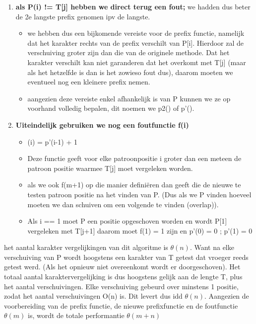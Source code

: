 \begin{enumerate}
\item \textbf{als P(i) != T[j] hebben we direct terug een fout;} we hadden dus beter de 2e langste prefix genomen ipv de langste.
\begin{itemize}
\item we hebben dus een bijkomende vereiste voor de prefix functie, namelijk dat het karakter rechts van de prefix verschilt van P[i]. Hierdoor zal de verschuiving groter zijn dan die van de originele methode. Dat het karakter verschilt kan niet garanderen dat het overkomt met T[j] (maar als het hetzelfde is dan is het zowieso fout dus), daarom moeten we eventueel nog een kleinere prefix nemen.
\item aangezien deze vereiste enkel afhankelijk is van P kunnen we ze op voorhand volledig bepalen, dit noemen we p2() of p'().
\end{itemize}
\clearpage
\item \textbf{Uiteindelijk gebruiken we nog een foutfunctie f(i)}
\begin{itemize}
\item (i) = p'(i-1) + 1
\item Deze functie geeft voor elke patroonpositie i groter dan een meteen de patroon positie waarmee T[j] moet vergeleken worden.
\item als we ook f(m+1) op die manier defini\"eren dan geeft die de nieuwe te testen patroon positie na het vinden van P. (Dus als we P vinden hoeveel moeten we dan schuiven om een volgende te vinden (overlap)).
\item Als i == 1 moet P een positie opgeschoven worden en wordt P[1] vergeleken met T[j+1] daarom moet f(1) = 1 zijn en p'(0) = 0 ; p'(1)  = 0
\end{itemize}
\end{enumerate}

het aantal karakter vergelijkingen van dit algoritme is $\theta(n)$. Want na elke verschuiving van P wordt hoogstens een karakter van T getest dat vroeger reeds getest werd. (Als het opnieuw niet overeenkomt wordt er doorgeschoven). Het totaal aantal karaktervergelijking is dus hoogstens gelijk aan de lengte T, plus het aantal verschuivingen. Elke verschuiving gebeurd over minstens 1 positie, zodat het aantal verschuivingen O(n) is. Dit levert dus idd $\theta(n)$.
\npar
Aangezien de voorbereiding van de prefix functie, de nieuwe prefixfunctie en de foutfunctie $\theta(m)$ is, wordt de totale performantie $\theta(m+n)$
\clearpage
